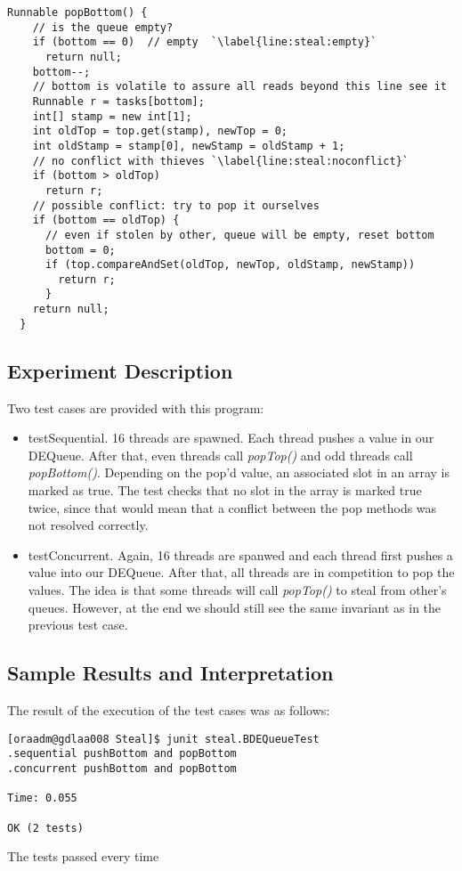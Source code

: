 \par
\hfill
\begin{lstlisting}[style=numbers]
  Runnable popBottom() {
    // is the queue empty?
    if (bottom == 0)  // empty  `\label{line:steal:empty}`
      return null;
    bottom--;
    // bottom is volatile to assure all reads beyond this line see it
    Runnable r = tasks[bottom];
    int[] stamp = new int[1];
    int oldTop = top.get(stamp), newTop = 0;
    int oldStamp = stamp[0], newStamp = oldStamp + 1;
    // no conflict with thieves `\label{line:steal:noconflict}`
    if (bottom > oldTop)
      return r;
    // possible conflict: try to pop it ourselves
    if (bottom == oldTop) {
      // even if stolen by other, queue will be empty, reset bottom
      bottom = 0;
      if (top.compareAndSet(oldTop, newTop, oldStamp, newStamp))
        return r;
      } 
    return null;
  }
\end{lstlisting}
\hfill
\par
\subsection{Experiment Description}
\par
Two test cases are provided with this program:
\begin{itemize}
\item testSequential. 16 threads are spawned. Each thread pushes a value in our
DEQueue. After that, even threads call \textit{popTop()} and odd threads call
\textit{popBottom()}. Depending on the pop'd value, an associated slot in an
array is marked as true. The test checks that no slot in the array is marked
true twice, since that would mean that a conflict between the pop methods was
not resolved correctly.
\item testConcurrent. Again, 16 threads are spanwed and each thread first pushes
a value into our DEQueue. After that, all threads are in competition to pop the
values. The idea is that some threads will call \textit{popTop()} to steal from
other's queues. However, at the end we should still see the same invariant as in
the previous test case.
\end{itemize}
\par
\subsection{Sample Results and Interpretation}
\par
The result of the execution of the test cases was as follows:
\par
\hfill
\begin{verbatim}
[oraadm@gdlaa008 Steal]$ junit steal.BDEQueueTest
.sequential pushBottom and popBottom
.concurrent pushBottom and popBottom

Time: 0.055

OK (2 tests)
\end{verbatim}
\hfill
\par
The tests passed every time
